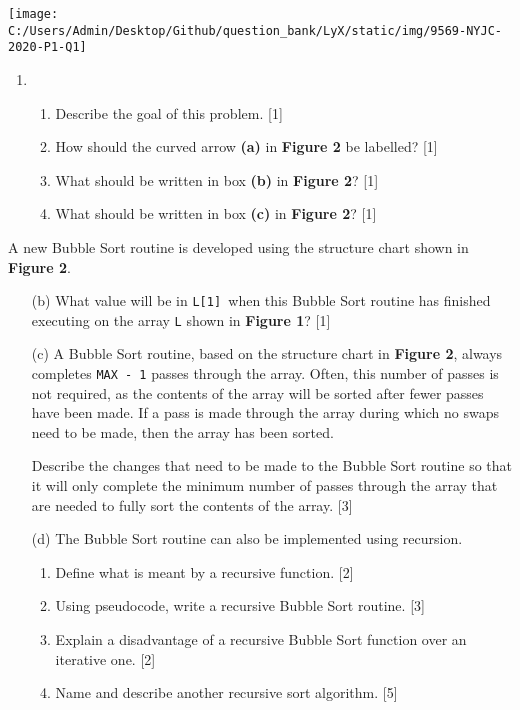 \begin{center}
\texttt{[image: C:/Users/Admin/Desktop/Github/question\_bank/LyX/static/img/9569-NYJC-2020-P1-Q1]}
\par\end{center}
\begin{enumerate}
\item {}
\begin{enumerate}
\item Describe the goal of this problem. \hfill{}{[}1{]}
\item How should the curved arrow \textbf{(a)} in \textbf{Figure 2} be labelled?
\hfill{}{[}1{]}
\item What should be written in box \textbf{(b)} in \textbf{Figure 2}? \hfill{}{[}1{]}
\item What should be written in box\textbf{ (c)} in \textbf{Figure 2}? \hfill{}{[}1{]}
\end{enumerate}
\end{enumerate}
A new Bubble Sort routine is developed using the structure chart shown
in \textbf{Figure 2}.
\begin{enumerate}
\item[(b)] What value will be in \texttt{L{[}1{]} }when this Bubble Sort routine
has finished executing on the array \texttt{L} shown in \textbf{Figure
1}? \hfill{}{[}1{]}
\item[(c)]  A Bubble Sort routine, based on the structure chart in \textbf{Figure
2}, always completes \texttt{MAX - 1} passes through the array. Often,
this number of passes is not required, as the contents of the array
will be sorted after fewer passes have been made. If a pass is made
through the array during which no swaps need to be made, then the
array has been sorted.

Describe the changes that need to be made to the Bubble Sort routine
so that it will only complete the minimum number of passes through
the array that are needed to fully sort the contents of the array.
\hfill{} {[}3{]}
\item[(d)] The Bubble Sort routine can also be implemented using recursion. 
\begin{enumerate}
\item Define what is meant by a recursive function. \hfill{} {[}2{]}
\item Using pseudocode, write a recursive Bubble Sort routine.\hfill{}
{[}3{]}
\item Explain a disadvantage of a recursive Bubble Sort function over an
iterative one.\hfill{} {[}2{]}
\item Name and describe another recursive sort algorithm. \hfill{} {[}5{]}
\end{enumerate}
\end{enumerate}